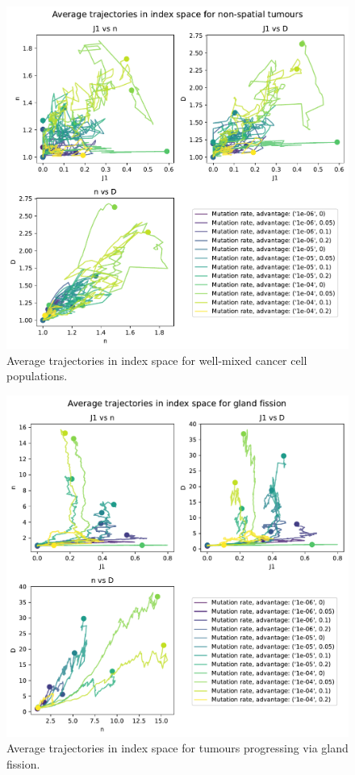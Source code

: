 \begin{figure}
    \centering
    \includegraphics[width=\textwidth]{Chapter_3/figures/indspace-non-spatial.pdf}
    \caption{Average trajectories in index space for well-mixed
    cancer cell populations.}
    \label{fig:non-spatial-indspace}
\end{figure}
\begin{figure} \centering
    \includegraphics[width=\textwidth]{Chapter_3/figures/indspace-gland.pdf}
    \caption{Average trajectories in index space for tumours
    progressing via gland fission.}
    \label{fig:gland-indspace}
\end{figure}
